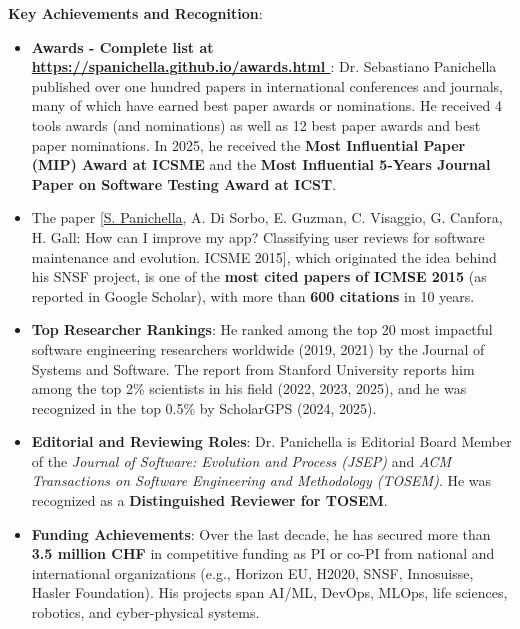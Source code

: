 \documentclass[11pt]{article}
\begin{document}
\vspace{1mm}
 \textbf{Key Achievements and Recognition}:
\begin{itemize}
\vspace{-2mm} 
 \item \textbf{Awards - Complete list at \href{https://spanichella.github.io/awards.html}{https://spanichella.github.io/awards.html
}}: Dr. Sebastiano Panichella published over one hundred papers in international conferences and journals, many of which have earned best paper awards or nominations. He received 4 tools awards (and nominations) as well as 12 best paper awards and best paper nominations. In 2025, he received the \textbf{Most Influential Paper (MIP) Award at ICSME} and the \textbf{Most Influential 5-Years Journal Paper on Software Testing Award at ICST}. 
 \vspace{-2.5mm}
  \item The paper [\underline{S. Panichella}, A. Di Sorbo, E. Guzman, C. Visaggio, G. Canfora, H. Gall: How can I improve my app? Classifying user reviews for software maintenance and evolution. ICSME 2015], which originated the idea behind his SNSF project, is one of the \textbf{most cited papers of ICMSE 2015} (as reported in Google Scholar), with more than \textbf{600 citations} in 10 years.  
  \vspace{-2.5mm}
\item 
    \textbf{Top Researcher Rankings}: He ranked among the top 20 most impactful software engineering researchers worldwide (2019, 2021) by the Journal of Systems and Software. The report from Stanford University reports him among the top 2\% scientists in his field (2022, 2023, 2025), and he was recognized in the top 0.5\% by ScholarGPS (2024, 2025). 
\item
    \textbf{Editorial and Reviewing Roles}: Dr. Panichella is Editorial Board Member of the \textit{Journal of Software: Evolution and Process (JSEP)} and \textit{ACM Transactions on Software Engineering and Methodology (TOSEM)}. He was recognized as a \textbf{Distinguished Reviewer for TOSEM}. 
 \vspace{-2.5mm}
 \item 
    \textbf{Funding Achievements}: Over the last decade, he has secured more than \textbf{3.5 million CHF} in competitive funding as PI or co-PI from national and international organizations (e.g., Horizon EU, H2020, SNSF, Innosuisse, Hasler Foundation). His projects span AI/ML, DevOps, MLOps, life sciences, robotics, and cyber-physical systems. 
 \vspace{-2.5mm}

\end{itemize}
\end{document}
